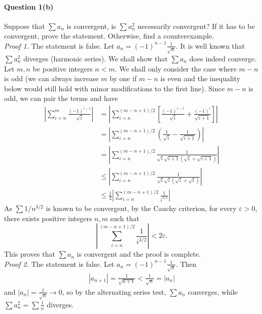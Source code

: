 \documentclass{article}
\begin{document}
\pagebreak

\paragraph{Question 1(b)} Suppose that $\sum a_n$ is convergent, is $\sum a_n^2$ necessarily convergent? If it has to be convergent, prove the statement. Otherwise, find a counterexample. \\
\textit{Proof 1.} The statement is false. Let $a_n = (-1)^{n-1}\frac{1}{\sqrt{n}}$. It is well known that $\sum a_n^2$ diverges (harmonic series). We shall show that $\sum a_n$ does indeed converge. Let $m, n$ be positive integers $n < m$. We shall only consider the case where $m - n$ is odd (we can always increase $m$ by one if $m - n$ is even and the inequality below would still hold with minor modifications to the first line). Since $m - n$ is odd, we can pair the terms and have
\begin{align*}
    \left| \sum_{i=n}^m \frac{(-1)^{i-1}}{\sqrt{i}} \right| &= \left| \sum_{i=n}^{(m-n+1)/2} \left[ \frac{(-1)^{i-1}}{\sqrt{i}} + \frac{(-1)^{i}}{\sqrt{i+1}} \right] \right| \\
    &= \left| \sum_{i=n}^{(m-n+1)/2} \left(\frac{1}{\sqrt{i}} - \frac{1}{\sqrt{i+1}}\right) \right| \\
    &= \left| \sum_{i=n}^{(m-n+1)/2} \frac{1}{\sqrt{i}\sqrt{i+1}(\sqrt{i} + \sqrt{i+1})} \right| \\
    &\leq \left| \sum_{i=n}^{(m-n+1)/2} \frac{1}{\sqrt{i}\sqrt{i}(\sqrt{i} + \sqrt{i})} \right| \\
    &\leq \frac{1}{2} \left| \sum_{i=n}^{(m-n+1)/2} \frac{1}{i^{3/2}} \right|
\end{align*}
As $\sum 1/n^{3/2}$ is known to be convergent, by the Cauchy criterion, for every $\varepsilon > 0$, there exists positive integers $n, m$ such that 
$$\left| \sum_{i=n}^{(m-n+1)/2} \frac{1}{i^{3/2}} \right| < 2\varepsilon.$$
This proves that $\sum a_n$ is convergent and the proof is complete. \\

\noindent\textit{Proof 2.} The statement is false. Let $a_n = (-1)^{n-1}\frac{1}{\sqrt{n}}$. Then 
\begin{align*}
    |a_{n+1}| = \frac{1}{\sqrt{n+1}} < \frac{1}{\sqrt{n}} = |a_n|
\end{align*}
and $|a_n| = \frac{1}{\sqrt{n}}\to 0$, so by the alternating series test, $\sum a_n$ converges, while $\sum a_n^2 = \sum \frac{1}{n}$ diverges.

\pagebreak
\end{document}

